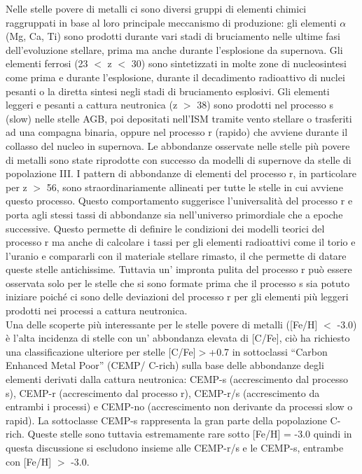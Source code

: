\documentclass[12pt]{article}
\begin{document}
Nelle stelle povere di metalli ci sono diversi gruppi di elementi chimici raggruppati in base al loro principale meccanismo di produzione: gli elementi $\alpha$ (Mg, Ca, Ti) sono prodotti durante vari stadi di bruciamento nelle ultime fasi dell’evoluzione stellare, prima ma anche durante l’esplosione da supernova. Gli elementi ferrosi (23 $<$ z $<$ 30)  sono sintetizzati in molte zone di nucleosintesi come prima e durante l’esplosione, durante il decadimento radioattivo di nuclei pesanti o la diretta sintesi negli stadi di bruciamento esplosivi. Gli elementi leggeri e pesanti a cattura neutronica (z $>$ 38) sono prodotti nel processo s (slow) nelle stelle AGB, poi depositati nell’ISM tramite vento stellare o trasferiti ad una compagna binaria, oppure nel processo r (rapido) che avviene durante il collasso del nucleo in supernova. Le abbondanze osservate nelle stelle più povere di metalli sono state riprodotte con successo da modelli di supernove da stelle di popolazione III. 
I pattern di abbondanze di elementi del processo r, in particolare per z $>$ 56, sono straordinariamente allineati per tutte le stelle in cui avviene questo processo. Questo comportamento suggerisce l’universalità del processo r e porta agli stessi tassi di abbondanze sia nell’universo primordiale che a epoche successive. Questo permette di definire le condizioni dei modelli teorici del processo r ma anche di calcolare i tassi per gli elementi radioattivi come il torio e l’uranio e compararli con il materiale stellare rimasto, il che permette di datare queste stelle antichissime. Tuttavia un' impronta pulita del processo r può essere osservata solo per le stelle che si sono formate prima che il processo s sia potuto iniziare poiché ci sono delle deviazioni del processo r per gli elementi più leggeri prodotti nei processi a cattura neutronica. \\

Una delle scoperte più interessante per le stelle povere di metalli ([Fe/H] $<$ -3.0) è l’alta incidenza di stelle con un' abbondanza elevata di [C/Fe], ciò ha richiesto una classificazione ulteriore per stelle [C/Fe]$>$+0.7 in sottoclassi “Carbon Enhanced Metal Poor” (CEMP/ C-rich) sulla base delle abbondanze degli elementi derivati dalla cattura neutronica: CEMP-s (accrescimento dal processo s), CEMP-r (accrescimento dal processo r), CEMP-r/s (accrescimento da entrambi i processi) e CEMP-no (accrescimento non derivante da processi slow o rapid). La sottoclasse CEMP-s rappresenta la gran parte della popolazione C-rich. Queste stelle sono tuttavia estremamente rare sotto [Fe/H] = -3.0 quindi in questa discussione si escludono insieme alle CEMP-r/s e le CEMP-s, entrambe con [Fe/H] $>$ -3.0. 
\end{document}
